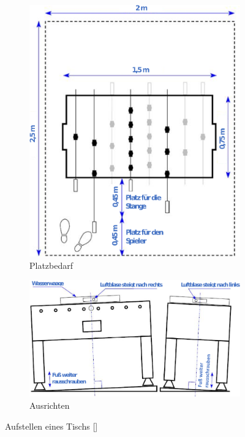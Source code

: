 \begin{figure}
\centering 
\begin{subfigure}[b]{0.7\textwidth} 
\includegraphics[width=\textwidth]{img/tisch_platzbedarf.png} 
\caption{Platzbedarf} 
\label{fig:tisch:platzbedarf} 
\vspace{0.5cm}
\end{subfigure} 
\begin{subfigure}[b]{0.7\textwidth} 
\includegraphics[width=\textwidth]{img/tisch_ausrichten.png} 
\caption{Ausrichten} 
\label{fig:tisch:ausrichten} 
\end{subfigure} 
\label{fig:tisch} 
\caption{Aufstellen eines Tischs [\cite{itsf_basics}]} 
\end{figure}

